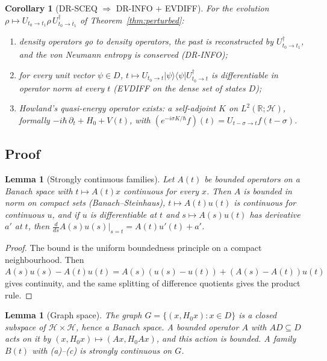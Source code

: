 \documentclass[11pt]{article}
\newtheorem{lemma}[theorem]{Lemma}
\newtheorem{corollary}[theorem]{Corollary}
\theoremstyle{definition}
\theoremstyle{remark}
\begin{document}
\begin{corollary}[DR-SCEQ $\Rightarrow$ DR-INFO $+$ EVDIFF]\label{cor:perturbed}
  For the evolution $\rho\mapsto U_{t_0\to t_1}\rho\,U_{t_0\to t_1}^\dagger$ of
  Theorem~\ref{thm:perturbed}:
  \begin{enumerate}
    \item[(i)] density operators go to density operators, the past is reconstructed by
      $U_{t_0\to t_1}^\dagger$, and the von Neumann entropy is conserved (DR-INFO);
    \item[(ii)] for every unit vector $\psi\in D$, $t\mapsto U_{t_0\to t}|\psi\rangle\langle\psi|
      U_{t_0\to t}^\dagger$ is differentiable in operator norm at every $t$ (EVDIFF on the dense
      set of states $D$);
    \item[(iii)] Howland's quasi-energy operator exists: a self-adjoint $K$ on
      $L^2(\mathbb R;\mathcal H)$, formally $-i\hbar\,\partial_t + H_0 + V(t)$, with
      $(e^{-i\sigma K/\hbar}f)(t) = U_{t-\sigma\to t}f(t-\sigma)$.
  \end{enumerate}
\end{corollary}

\subsection{Proof}

\begin{lemma}[Strongly continuous families]\label{lem:strong}
  Let $A(t)$ be bounded operators on a Banach space with $t\mapsto A(t)x$ continuous for every
  $x$. Then $A$ is bounded in norm on compact sets (Banach--Steinhaus), $t\mapsto A(t)u(t)$ is
  continuous for continuous $u$, and if $u$ is differentiable at $t$ and $s\mapsto A(s)u(t)$ has
  derivative $a'$ at $t$, then $\frac{d}{ds}A(s)u(s)|_{s=t} = A(t)u'(t) + a'$.
\end{lemma}

\begin{proof}
  The bound is the uniform boundedness principle on a compact neighbourhood. Then
  $A(s)u(s) - A(t)u(t) = A(s)(u(s)-u(t)) + (A(s)-A(t))u(t)$ gives continuity, and the same
  splitting of difference quotients gives the product rule.
\end{proof}

\begin{lemma}[Graph space]\label{lem:graph}
  The graph $G = \{(x, H_0x) : x\in D\}$ is a closed subspace of $\mathcal H\times\mathcal H$,
  hence a Banach space. A bounded operator $A$ with $AD\subseteq D$ acts on it by
  $(x, H_0x)\mapsto(Ax, H_0Ax)$, and this action is bounded. A family $B(t)$ with (a)--(c) is
  strongly continuous on $G$.
\end{lemma}
\end{document}
